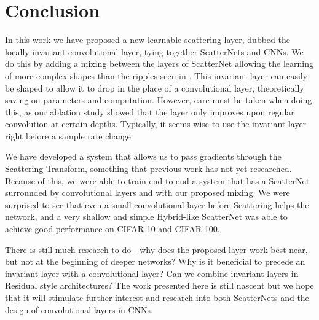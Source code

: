 \section{Conclusion}\label{sec:conclusion}
In this work we have proposed a new learnable scattering layer, dubbed the
locally invariant convolutional layer, tying together ScatterNets and CNNs.
We do this by adding a mixing between the layers of ScatterNet allowing the
learning of more complex shapes than the ripples seen in
\cite{cotter_visualizing_2017}. This invariant layer can easily be shaped to allow
it to drop in the place of a convolutional layer, theoretically saving on parameters and
computation. However, care must be taken when doing this, as our ablation study
showed that the layer only improves upon regular convolution at certain depths.
Typically, it seems wise to use the invariant layer right before a sample rate
change.

We have developed a system that allows us to pass
gradients through the Scattering Transform, something that previous work has not
yet researched. Because of this, we were able to train end-to-end a system that
has a ScatterNet surrounded by convolutional layers and with our proposed mixing. 
We were surprised to see that even a small
convolutional layer before Scattering helps the network, and a
very shallow and simple Hybrid-like ScatterNet was able to achieve good
performance on CIFAR-10 and CIFAR-100.

There is still much research to do - why does the proposed layer work best near,
but not at the beginning of deeper networks? Why is it beneficial to precede an
invariant layer with a convolutional layer? Can we combine invariant layers in
Residual style architectures? The work presented here is still
nascent but we hope that it will stimulate further interest and research into both
ScatterNets and the design of convolutional layers in CNNs.

